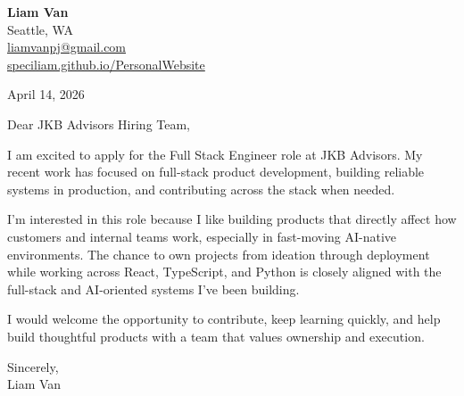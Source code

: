 \documentclass[letterpaper,11pt]{article}
\begin{document}
\begin{flushleft}
\textbf{\Large Liam Van} \\
Seattle, WA \\
\href{mailto:liamvanpj@gmail.com}{liamvanpj@gmail.com} \\
\href{https://speciliam.github.io/PersonalWebsite}{speciliam.github.io/PersonalWebsite}
\end{flushleft}

April 14, 2026

\noindent Dear JKB Advisors Hiring Team,

\noindent I am excited to apply for the Full Stack Engineer role at JKB Advisors. My recent work has focused on full-stack product development, building reliable systems in production, and contributing across the stack when needed.

\noindent I'm interested in this role because I like building products that directly affect how customers and internal teams work, especially in fast-moving AI-native environments. The chance to own projects from ideation through deployment while working across React, TypeScript, and Python is closely aligned with the full-stack and AI-oriented systems I've been building.

\noindent I would welcome the opportunity to contribute, keep learning quickly, and help build thoughtful products with a team that values ownership and execution.

\noindent Sincerely, \\
Liam Van
\end{document}
